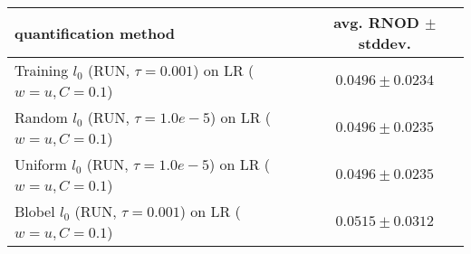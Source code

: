 \begin{tabular}{lc}
  \toprule
  quantification method & avg. RNOD $\pm$ stddev. \\
  \midrule
  Training $l_0$ (RUN, $\tau=0.001$) on LR ($w=u, C=0.1$) & $\mathbf{0.0496 \pm 0.0234}$ \\
  Random $l_0$ (RUN, $\tau=1.0e-5$) on LR ($w=u, C=0.1$) & $0.0496 \pm 0.0235$ \\
  Uniform $l_0$ (RUN, $\tau=1.0e-5$) on LR ($w=u, C=0.1$) & $0.0496 \pm 0.0235$ \\
  Blobel $l_0$ (RUN, $\tau=0.001$) on LR ($w=u, C=0.1$) & $0.0515 \pm 0.0312$ \\
  \bottomrule
\end{tabular}
